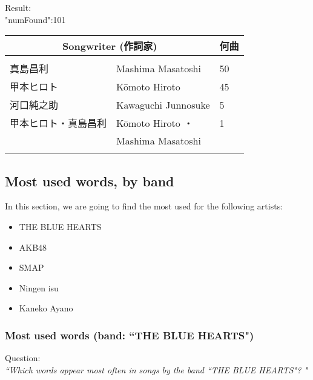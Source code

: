 \bigskip
Result: \\

"numFound":101

\begin{longtable}{|l l|l|}
	\hline
	\multicolumn{2}{|c|}{Songwriter (作詞家)} & 
	\multicolumn{1}{|c|}{何曲}
	\\
	\hline
	& & \\
	\endhead
	
	\hline
	\endfoot
	
	真島昌利 & Mashima Masatoshi & 50 \\
	甲本ヒロト & Kōmoto Hiroto & 45 \\
	河口純之助 & Kawaguchi Junnosuke & 5 \\
	甲本ヒロト・真島昌利 & Kōmoto Hiroto ・ & 1 \\
	& Mashima Masatoshi& \\
	& & \\
\end{longtable}

\bigskip






\newpage

\subsection{Most used words, by band} \label{most-used-words-by-band}

In this section, we are going to find the most used for the following artists:

\begin{itemize}
	\item THE BLUE HEARTS
	\item AKB48
	\item SMAP
	\item Ningen isu
	\item Kaneko Ayano
\end{itemize}

\bigskip


\subsubsection{Most used words (band: ``THE BLUE HEARTS")} \label{most-used-words-BLUE-HEARTS}

Question: \\
\emph{``Which words appear most often in songs by the band ``THE BLUE HEARTS"? "} \\

